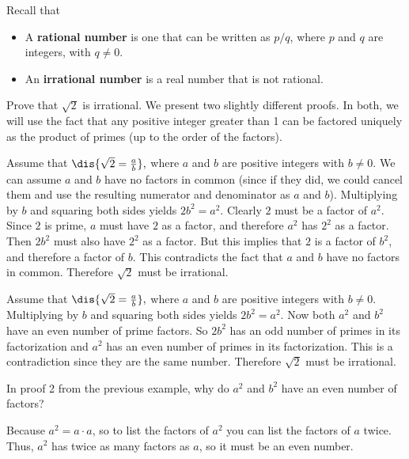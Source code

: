 \begin{df}
Recall that 
\begin{itemize}
\item A {\bf rational number} is one that can be written as $p/q$, where $p$ and $q$ are integers,
with $q\neq 0$.
\item An {\bf irrational number} is a real number that is not rational.
\end{itemize}
\end{df}

\begin{exa}\label{sqrt2irr}
Prove that $\sqrt{2}$ is irrational.
We present two slightly different proofs.  In both, we will use the fact that any positive
integer greater than 1 can be factored uniquely as the product of primes (up to the order of the factors).
\begin{pfenum}
\item 
Assume that $\dis{\sqrt{2} = \frac{a}{b}},$ where
$a$ and $b$ are positive integers with $b\neq 0$.  We can assume $a$ and $b$ have no factors in common 
(since if they did, we could cancel them and use the resulting numerator and denominator as $a$ and $b$).
Multiplying by $b$ and squaring both sides yields  $2b^2 = a^2.$ 
Clearly $2$ must be a factor of $a^2$.  Since $2$ is prime,  $a$ must have $2$ as a factor, and 
therefore $a^2$ has $2^2$ as a factor.  Then $2b^2$ must also have $2^2$
as a factor.  But this implies that $2$ is a factor of $b^2$, and therefore a factor of $b$.  
This contradicts the fact that $a$ and $b$ 
have no factors in common.  Therefore $\sqrt{2}$ must be irrational.
\item
Assume that $\dis{\sqrt{2} = \frac{a}{b}},$ where
$a$ and $b$ are positive integers with $b\neq 0$. 
Multiplying by $b$ and squaring both sides yields $2b^2 = a^2.$ Now both $a^2$ and $b^2$ have an
even number of prime factors. So $2b^2$ has an odd number of
primes in its factorization and $a^2$ has an even number of primes
in its factorization. This is a contradiction since they are the same number. 
Therefore $\sqrt{2}$ must be irrational.
\end{pfenum}
\end{exa}

\begin{ques}
In proof 2 from the previous example, why do $a^2$ and $b^2$ have an even number of factors?\\
\answerlinethree
\begin{answer}
Because $a^2=a\cdot a$, so to list the factors of $a^2$ you can list the factors of $a$ twice.
Thus, $a^2$ has twice as many factors as $a$, so it must be an even number.
\end{answer}
\end{ques}

